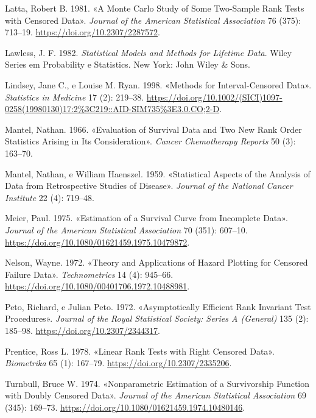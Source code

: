 \documentclass[
  12pt,
  letterpaper,
  DIV=11,
  numbers=noendperiod]{scrreprt}
\newlength{\cslhangindent}
\newenvironment{CSLReferences}[2] %
 {\begin{list}{}{%
  \setlength{\itemindent}{0pt}
  \setlength{\leftmargin}{0pt}
  \setlength{\parsep}{0pt}
  \ifodd #1
   \setlength{\leftmargin}{\cslhangindent}
   \setlength{\itemindent}{-1\cslhangindent}
  \fi
  \setlength{\itemsep}{#2\baselineskip}}}
 {\end{list}}
\begin{document}
\begin{CSLReferences}{1}{0}
Latta, Robert B. 1981. {«A Monte Carlo Study of Some Two-Sample Rank
Tests with Censored Data»}. \emph{Journal of the American Statistical
Association} 76 (375): 713--19. \url{https://doi.org/10.2307/2287572}.

Lawless, J. F. 1982. \emph{Statistical Models and Methods for Lifetime
Data}. Wiley Series em Probability e Statistics. New York: John Wiley \&
Sons.

Lindsey, Jane C., e Louise M. Ryan. 1998. {«Methods for
Interval-Censored Data»}. \emph{Statistics in Medicine} 17 (2): 219--38.
\url{https://doi.org/10.1002/(SICI)1097-0258(19980130)17:2\%3C219::AID-SIM735\%3E3.0.CO;2-D}.

Mantel, Nathan. 1966. {«Evaluation of Survival Data and Two New Rank
Order Statistics Arising in Its Consideration»}. \emph{Cancer
Chemotherapy Reports} 50 (3): 163--70.

Mantel, Nathan, e William Haenszel. 1959. {«Statistical Aspects of the
Analysis of Data from Retrospective Studies of Disease»}. \emph{Journal
of the National Cancer Institute} 22 (4): 719--48.

Meier, Paul. 1975. {«Estimation of a Survival Curve from Incomplete
Data»}. \emph{Journal of the American Statistical Association} 70 (351):
607--10. \url{https://doi.org/10.1080/01621459.1975.10479872}.

Nelson, Wayne. 1972. {«Theory and Applications of Hazard Plotting for
Censored Failure Data»}. \emph{Technometrics} 14 (4): 945--66.
\url{https://doi.org/10.1080/00401706.1972.10488981}.

Peto, Richard, e Julian Peto. 1972. {«Asymptotically Efficient Rank
Invariant Test Procedures»}. \emph{Journal of the Royal Statistical
Society: Series A (General)} 135 (2): 185--98.
\url{https://doi.org/10.2307/2344317}.

Prentice, Ross L. 1978. {«Linear Rank Tests with Right Censored Data»}.
\emph{Biometrika} 65 (1): 167--79.
\url{https://doi.org/10.2307/2335206}.

Turnbull, Bruce W. 1974. {«Nonparametric Estimation of a Survivorship
Function with Doubly Censored Data»}. \emph{Journal of the American
Statistical Association} 69 (345): 169--73.
\url{https://doi.org/10.1080/01621459.1974.10480146}.

\end{CSLReferences}
\end{document}
